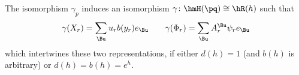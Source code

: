 \begin{theorem}\label{O-isomorphism}
 The isomorphism $\gamma_p$ induces an isomorphism $\gamma\colon \hmH(\pq)\cong
 \hR(h)$ such that \[\gamma(X_r)=\sum_{\Bu}u_rb(y_r)e_{\Bu} \qquad \gamma(\Phi_r)=\sum_{\Bu}
 A_r^{\Bu}\psi_re_{\Bu}\]
 which intertwines these two representations, if either $d(h)=1$ (and
 $b(h)$ is arbitrary) or 
 $d(h)=b(h)=e^h$.
\end{theorem}
